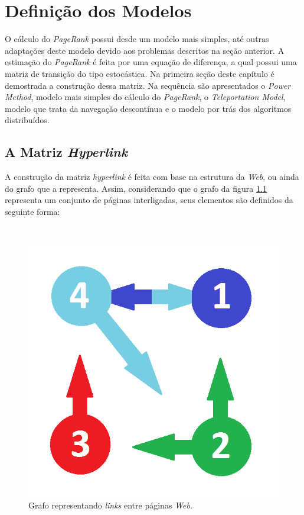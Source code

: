 \chapter{Definição dos Modelos}%

O cálculo do \textit{PageRank} possui desde um modelo mais simples, até outras adaptações deste modelo devido aos problemas descritos na seção anterior. A estimação do \textit{PageRank} é feita por uma equação de diferença, a qual possui uma matriz de transição do tipo estocástica. Na primeira seção deste capítulo é demostrada a construção dessa matriz. Na sequência são apresentados o \textit{Power Method}, modelo mais simples do cálculo do \textit{PageRank}, o \textit{Teleportation Model}, modelo que trata da navegação descontínua e o modelo por trás dos algoritmos distribuídos.   


\section{A Matriz \textit{Hyperlink}}%

A construção da matriz \textit{hyperlink} é feita com base na estrutura da \textit{Web}, ou ainda do grafo que a representa. Assim, considerando que o grafo da figura \ref{grafo} representa um conjunto de páginas interligadas, seus elementos são definidos da seguinte forma: 

\
\begin{figure}[!htb]
	\centering
	\includegraphics[scale=0.4]{imagens/grafo}
	\caption{Grafo representando \textit{links} entre páginas \textit{Web}.}
	\label{grafo}
\end{figure}

